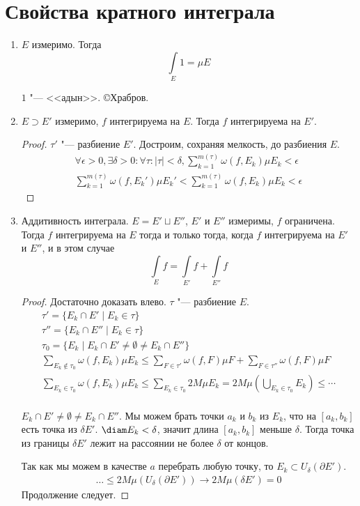 \section{Свойства кратного интеграла}

\begin{enumerate}
\item
	$E$ измеримо.
	Тогда
	\[ \int\limits_E 1 = \mu E \]
	\begin{Rem}
		$1$ "--- <<адын>>. \copyright Храбров.
	\end{Rem}

\item
	$E \supset E'$ измеримо, $f$ интегрируема на $E$.
	Тогда $f$ интегрируема на $E'$.
	\begin{proof}
		$\tau'$ "--- разбиение $E'$. Достроим, сохраняя мелкость, до разбиения $E$.
		\begin{gather*}
			\forall \epsilon > 0, \exists \delta > 0\colon \forall \tau\colon |\tau| < \delta,
				\sum_{k=1}^{m(\tau)} \omega(f, E_k) \mu E_k < \epsilon \\
			\sum_{k=1}^{m(\tau)} \omega(f, E_k') \mu E_k' < \sum_{k=1}^{m(\tau)} \omega(f, E_k) \mu E_k < \epsilon
		\end{gather*}
	\end{proof}

\item
	Аддитивность интеграла.
	$E = E' \sqcup E''$, $E'$ и $E''$ измеримы, $f$ ограничена.
	Тогда $f$ интегрируема на $E$ тогда и только тогда, когда $f$ интегрируема на $E'$ и $E''$, и в этом случае
	\[ \int\limits_E f = \int\limits_{E'} f + \int\limits_{E''} f \]
	\begin{proof}
		Достаточно доказать влево. $\tau$ "--- разбиение $E$.
		\begin{gather*}
			\tau' = \{E_k \cap E' \mid E_k \in \tau\} \\
			\tau'' = \{E_k \cap E'' \mid E_k \in \tau\} \\
			\tau_0 = \{E_k \mid E_k \cap E' \ne \emptyset \ne E_k \cap E''\} \\
			\sum_{E_k \notin \tau_0} \omega(f, E_k) \mu E_k
				\le \sum_{F \in \tau'} \omega(f, F) \mu F + \sum_{F \in \tau''} \omega(f, F) \mu F \\
			\sum_{E_k \in \tau_0} \omega(f, E_k) \mu E_k
				\le \sum_{E_k \in \tau_0} 2M \mu E_k = 2M \mu \left( \bigcup_{E_k \in \tau_0} E_k \right) \le \cdots \\
		\end{gather*}

		$E_k \cap E' \ne \emptyset \ne E_k \cap E''$.
		Мы можем брать точки $a_k$ и $b_k$ из $E_k$, что на $[a_k, b_k]$ есть точка из $\delta E'$.
		$\diam E_k < \delta$, значит длина $[a_k, b_k]$ меньше $\delta$.
		Тогда точка из границы $\delta E'$ лежит на рассоянии не более $\delta$ от концов.

		Так как мы можем в качестве $a$ перебрать любую точку, то $E_k \subset U_\delta (\partial E')$.
		\begin{gather*}
			\dots \le 2M \mu(U_\delta (\partial E')) \to 2M \mu(\delta E') = 0
		\end{gather*}
		Продолжение следует.
	\end{proof}
\end{enumerate}
